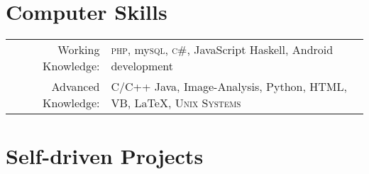 \documentclass[a4paper,10pt]{article}
\begin{document}

\section{Computer Skills}
\begin{tabular}{rl}
  Working Knowledge:& \textsc{php}, my\textsc{sql}, \textsc{c\#}, JavaScript Haskell, Android  development  \\
  Advanced Knowledge:& C/C++ Java, Image-Analysis, Python, HTML, VB, \LaTeX, \textsc{Unix Systems}
\end{tabular}
\par 

\section{Self-driven Projects}
\end{document}
